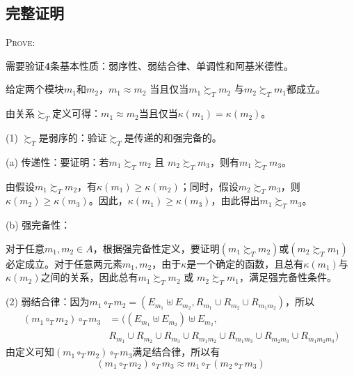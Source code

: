 \documentclass[14pt,a4paper,UTF8,twoside]{article}
\renewenvironment{proof}[1][Prove:]{\ProofBox\strut\textsc{#1}\space}{\endProofBox}
\begin{document}
\subsection{完整证明}

\begin{proof}

    需要验证\textbf{4}条基本性质：弱序性、弱结合律、单调性和阿基米德性。

    给定两个模块$m_1$和$m_2$，$m_1 \approx m_2$ 当且仅当$m_1 \succsim_T m_2$ 与$m_2 \succsim_T m_1$都成立。
    
    由关系$\succsim_T$定义可得：$m_1 \approx m_2$当且仅当$\kappa(m_1) = \kappa(m_2)$。

    \vspace{0.5cm}

    (1) $\succsim_T$是弱序的：验证$\succsim_T$是传递的和强完备的。

    (a) 传递性：要证明：若$m_1 \succsim_T m_2$ 且 $m_2 \succsim_T m_3$，则有$m_1 \succsim_T m_3$。

由假设$m_1 \succsim_T m_2$，有$\kappa(m_1) \geq \kappa(m_2)$；同时，假设$m_2 \succsim_T m_3$，则$\kappa(m_2) \geq \kappa(m_3)$。因此，$\kappa(m_1) \geq \kappa(m_3)$，由此得出$m_1 \succsim_T m_3$。

\vspace{0.5cm}
(b) 强完备性：

对于任意$m_1, m_2 \in A$，根据强完备性定义，要证明$(m_1 \succsim_T m_2)$或$(m_2 \succsim_T m_1)$必定成立。对于任意两元素$m_1, m_2$，由于$\kappa$是一个确定的函数，且总有$\kappa(m_1)$与$\kappa(m_2)$之间的关系，因此总有$m_1 \succsim_T m_2$ 或 $m_2 \succsim_T m_1$，满足强完备性条件。



\vspace{1cm}

(2) 弱结合律：因为$m_1 \circ_T m_2 = (E_{m_1} \uplus E_{m_2}, R_{m_1} \cup R_{m_2} \cup R_{m_1m_2})$，所以
\begin{align*}
    (m_1 \circ_T m_2) \circ_T m_3 &= ((E_{m_1} \uplus E_{m_2}) \uplus E_{m_2}, \\
    &R_{m_1} \cup R_{m_2} \cup R_{m_3} \cup R_{m_1m_2} \cup R_{m_1m_3} \cup R_{m_2m_3} \cup R_{m_1m_2m_3})
\end{align*}
由定义可知$(m_1 \circ_T m_2) \circ_T m_3$满足结合律，所以有
\begin{equation*}
    (m_1 \circ_T m_2) \circ_T m_3 \approx m_1 \circ_T (m_2 \circ_T m_3)
\end{equation*}

\vspace{0.5cm}


\end{proof}
\end{document}
